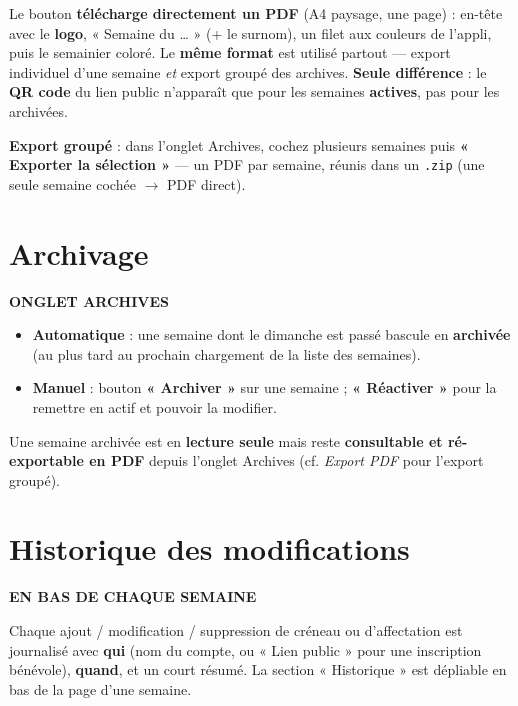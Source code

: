 \documentclass[11pt,a4paper]{article}
\newcommand{\eyebrow}[1]{{\sffamily\fontfamily{qag}\selectfont\bfseries\small\color{accentdark}\MakeUppercase{#1}}\par\vspace{2pt}}
\begin{document}
Le bouton \textbf{télécharge directement un PDF} (A4 paysage, une page) : en-tête avec le
\textbf{logo}, « Semaine du … » (+ le surnom), un filet aux couleurs de l'appli, puis le
semainier coloré. Le \textbf{même format} est utilisé partout — export individuel d'une semaine
\emph{et} export groupé des archives. \textbf{Seule différence} : le \textbf{QR code} du lien
public n'apparaît que pour les semaines \textbf{actives}, pas pour les archivées.

\vspace{4pt}
\textbf{Export groupé} : dans l'onglet Archives, cochez plusieurs semaines puis
\textbf{« Exporter la sélection »} — un PDF par semaine, réunis dans un \texttt{.zip} (une
seule semaine cochée $\rightarrow$ PDF direct).

\section{Archivage}
\eyebrow{Onglet Archives}

\begin{itemize}
  \item \textbf{Automatique} : une semaine dont le dimanche est passé bascule en
  \textbf{archivée} (au plus tard au prochain chargement de la liste des semaines).
  \item \textbf{Manuel} : bouton \textbf{« Archiver »} sur une semaine ; \textbf{« Réactiver »}
  pour la remettre en actif et pouvoir la modifier.
\end{itemize}

Une semaine archivée est en \textbf{lecture seule} mais reste \textbf{consultable et
ré-exportable en PDF} depuis l'onglet Archives (cf. \emph{Export PDF} pour l'export groupé).

\section{Historique des modifications}
\eyebrow{En bas de chaque semaine}

Chaque ajout / modification / suppression de créneau ou d'affectation est journalisé avec
\textbf{qui} (nom du compte, ou « Lien public » pour une inscription bénévole), \textbf{quand},
et un court résumé. La section « Historique » est dépliable en bas de la page d'une semaine.

\end{document}
